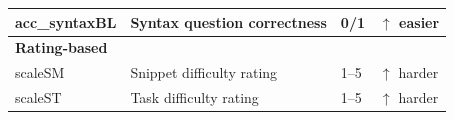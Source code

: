 \begin{table}[t]
\begin{tabularx}{\columnwidth}{l X l l}
acc\_syntaxBL & Syntax question correctness & 0/1 & $\uparrow$ easier \\

\midrule

\multicolumn{4}{l}{\textbf{Rating-based}} \\

scaleSM & Snippet difficulty rating & 1--5 & $\uparrow$ harder \\

scaleST & Task difficulty rating & 1--5 & $\uparrow$ harder \\

\bottomrule
\end{tabularx}
\end{table}
